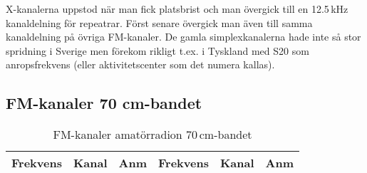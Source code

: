 {X-kanalerna uppstod när man fick platsbrist och man övergick till en
12.5\,kHz kanaldelning för repeatrar. Först senare övergick man även
till samma kanaldelning på övriga FM-kanaler. De gamla
simplexkanalerna hade inte så stor spridning i Sverige men förekom
rikligt t.ex. i Tyskland med S20 som anropsfrekvens (eller
aktivitetscenter som det numera kallas).

\clearpage

\subsection{FM-kanaler 70 cm-bandet}

\small

\begin{longtable}{rrl|rrl}
\caption{FM-kanaler amatörradion 70\,cm-bandet}\\
\textbf{Frekvens} & \textbf{Kanal} & \textbf{Anm} &
\textbf{Frekvens} & \textbf{Kanal} & \textbf{Anm} \\ \hline


\end{longtable}}
